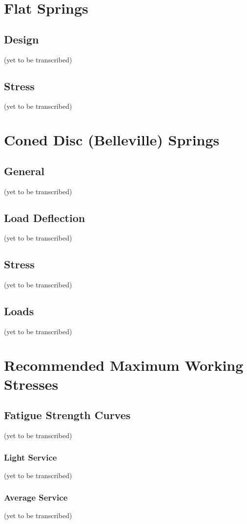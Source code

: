 \documentclass[10pt]{article}
\begin{document}
\section{Flat Springs}
\subsection{Design}
(yet to be transcribed)

\subsection{Stress}
(yet to be transcribed)

\section{Coned Disc (Belleville) Springs}
\subsection{General}
(yet to be transcribed)

\subsection{Load Deflection}
(yet to be transcribed)

\subsection{Stress}
(yet to be transcribed)

\subsection{Loads}
(yet to be transcribed)

\section{Recommended Maximum Working Stresses}
\subsection{Fatigue Strength Curves}
(yet to be transcribed)

\subsubsection{Light Service}
(yet to be transcribed)

\subsubsection{Average Service}
(yet to be transcribed)
\end{document}
